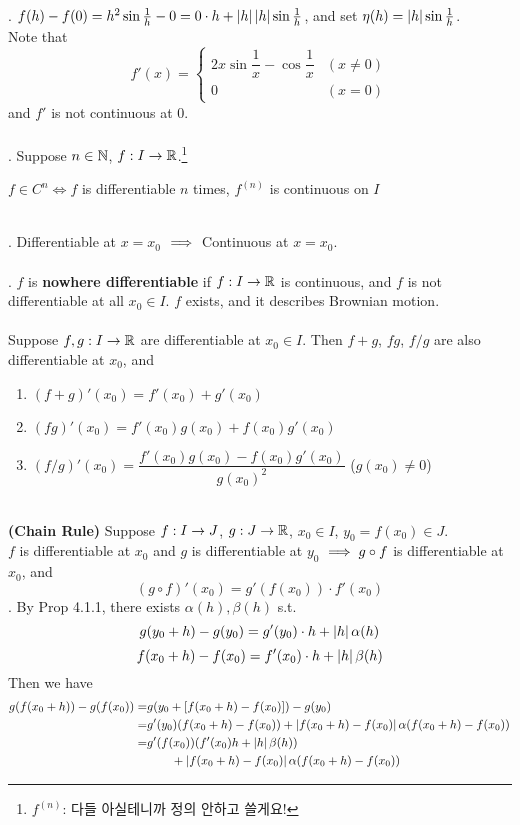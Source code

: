 \pf. $f(h) - f(0) = h^2\sin\frac{1}{h} - 0 = 0\cdot h + \left|h\right|\left|h\right|\sin\frac{1}{h}$, and set $\eta(h) = \left|h\right|\sin\frac{1}{h}$.\\
Note that $$f'(x) = \begin{cases}
	2x\sin\dfrac{1}{x} - \cos \dfrac{1}{x} & (x \neq 0)\\
	0 & (x = 0)
\end{cases}$$
and $f'$ is not continuous at 0.\\
\\
. Suppose $n\in \mathbb{N}$, $f: I\rightarrow \mathbb{R}$.\footnote{$f^{(n)}$: 다들 아실테니까 정의 안하고 쓸게요!}
\begin{center}
	$f\in C^n \iff f$ is differentiable $n$ times,
	 $f^{(n)}$ is continuous on $I$  
\end{center}
~\\
\rmk. Differentiable at $x = x_0$ $\implies$ Continuous at $x = x_0$.\\
\\
\rmk. $f$ is \textbf{nowhere differentiable} if $f:I\rightarrow \mathbb{R}$ is continuous, and $f$ is not differentiable at all $x_0\in I$. $f$ exists, and it describes Brownian motion.\\
\\
 Suppose $f, g:I\rightarrow \mathbb{R}$ are differentiable at $x_0\in I$. Then $f+g$, $fg$, $f/g$ are also differentiable at $x_0$, and
\begin{enumerate}
	\item $(f+g)'(x_0) = f'(x_0) + g'(x_0)$
	\item $(fg)'(x_0) = f'(x_0)g(x_0) + f(x_0)g'(x_0)$
	\item $\left(f/g\right)'(x_0) = \dfrac{f'(x_0)g(x_0) - f(x_0)g'(x_0)}{g(x_0)^2}$ ($g(x_0) \neq 0$)
\end{enumerate}~\\
 \textbf{(Chain Rule)} Suppose $f:I\rightarrow J$, $g:J\rightarrow\mathbb{R}$, $x_0\in I$, $y_0 = f(x_0) \in J$.\\
$f$ is differentiable at $x_0$ and $g$ is differentiable at $y_0$ $\implies g\circ f$ is differentiable at $x_0$, and $$(g\circ f)'(x_0) = g'(f(x_0))\cdot f'(x_0)$$
\pf. By Prop 4.1.1, there exists $\alpha(h), \beta(h)$ s.t. $$g(y_0 + h) - g(y_0) = g'(y_0)\cdot h + \left|h\right| \alpha(h)$$
$$f(x_0+h) - f(x_0) = f'(x_0)\cdot h + \left|h\right| \beta(h) $$
Then we have $$\begin{aligned}
g(f(x_0 + h)) - g(f(x_0)) =& g(y_0 + [f(x_0 +h) - f(x_0)]) - g(y_0)\\ =& g'(y_0)(f(x_0+h)-f(x_0))+ \left|f(x_0 + h) - f(x_0)\right| \alpha(f(x_0+h) - f(x_0)) \\
=& g'(f(x_0))(f'(x_0) h + \left|h\right|\beta(h)) \\
&\qquad + \left|f(x_0 + h) - f(x_0)\right|\alpha(f(x_0+h) - f(x_0)) 
\end{aligned}$$

